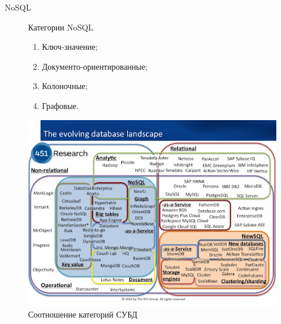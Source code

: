 \documentclass{beamer}
\begin{document}
\begin{frame}{NoSQL}

	\begin{figure}
		\begin{minipage}{0.36\textwidth}
			\begin{alertblock}{Категории NoSQL}
				\begin{enumerate}
					\item Ключ-значение;
					\item Документо-ориентированные;
					\item Колоночные;
					\item Графовые.
				\end{enumerate}
			\end{alertblock}
		\end{minipage}
		\hfill
		\begin{minipage}{0.62\textwidth}
			\centering
			\includegraphics[width=\linewidth]{./imgs/dblandscape.jpg}
			\caption{Соотношение категорий СУБД}
		\end{minipage}
	\end{figure}

\end{frame}
\end{document}
